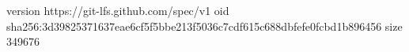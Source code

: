 version https://git-lfs.github.com/spec/v1
oid sha256:3d39825371637eae6cf5f5bbe213f5036c7cdf615c688dbfefe0fcbd1b896456
size 349676
